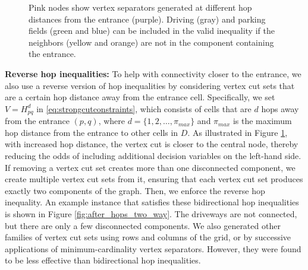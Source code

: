 \documentclass[10pt]{article}
\newcommand{\validdriveset}{D}
\newcommand{\zeroneighborset}[2]{N_{#1#2}^{0}}
\newcommand{\ninetyneighborset}[2]{N_{#1#2}^{90}}
\newcommand{\entrancex}{p}
\newcommand{\entrancey}{q}
\newcommand{\vertexcutset}{V}
\newcommand{\twowaypartitioncomp}[1]{V_{#1}'}
\newcommand{\invzeroparksetcut}[3]{\mathcal{P}^{0}_{#1#2}(#3)}
\newcommand{\invninetyparksetcut}[3]{\mathcal{P}_{#1#2}^{90}(#3)}
\theoremstyle{definition}
\begin{document}
\begin{figure}[H]
    \vspace{-2mm}
\caption{Pink nodes show vertex separators generated at different hop distances from the entrance (purple). Driving (gray) and parking fields (green and blue) can be included in the valid inequality if the neighbors (yellow and orange) are not in the component containing the entrance.}
\label{fig:reverse_hop_connectivity}
\end{figure}
\textbf{Reverse hop inequalities:} To help with connectivity closer to the entrance, we also use a reverse version of hop inequalities by considering vertex cut sets that are a certain hop distance away from the entrance cell. Specifically, we set $\vertexcutset = H_{\entrancex \entrancey}^d$ in \eqref{eq:strongcutconstraints}, which consists of cells that are $d$ hops away from the entrance $(\entrancex, \entrancey)$, where $d = \{1, 2, \ldots, \pi_{max}\}$ and $\pi_{max}$ is the maximum hop distance from the entrance to other cells in $\validdriveset$. As illustrated in Figure \ref{fig:reverse_hop_connectivity}, with increased hop distance, the vertex cut is closer to the central node, thereby reducing the odds of including additional decision variables on the left-hand side. If removing a vertex cut set creates more than one disconnected component, we create multiple vertex cut sets from it, ensuring that each vertex cut set produces exactly two components of the graph. Then, we enforce the reverse hop inequality. An example instance that satisfies these bidirectional hop inequalities is shown in Figure \ref{fig:after_hops_two_way}. The driveways are not connected, but there are only a few disconnected components. We also generated other families of vertex cut sets using rows and columns of the grid, or by successive applications of minimum-cardinality vertex separators. However, they were found to be less effective than bidirectional hop inequalities.
\end{document}
